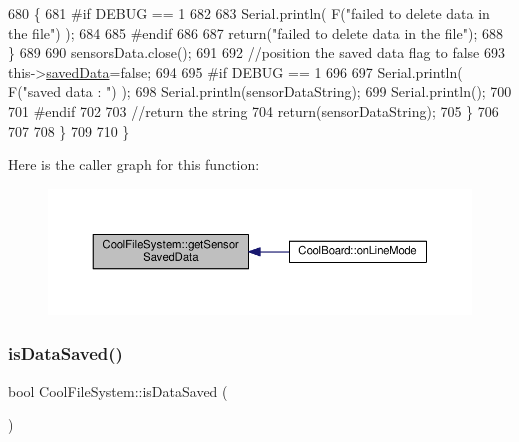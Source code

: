 \begin{DoxyCode}
680             \{
681 \textcolor{preprocessor}{            #if DEBUG == 1}
682         
683                 Serial.println( F(\textcolor{stringliteral}{"failed to delete data in the file"}) );
684         
685 \textcolor{preprocessor}{            #endif}
686 
687                 \textcolor{keywordflow}{return}(\textcolor{stringliteral}{"failed to delete data in the file"});
688             \}
689 
690             sensorsData.close();
691             
692             \textcolor{comment}{//position the saved data flag to false}
693             this->\hyperlink{classCoolFileSystem_ad398e0c5c41a0c88acdf5d672aa71351}{savedData}=\textcolor{keyword}{false}; 
694             
695 \textcolor{preprocessor}{        #if DEBUG == 1 }
696 
697             Serial.println( F(\textcolor{stringliteral}{"saved data : "}) );
698             Serial.println(sensorDataString);
699             Serial.println();
700         
701 \textcolor{preprocessor}{        #endif}
702 
703             \textcolor{comment}{//return the string}
704             \textcolor{keywordflow}{return}(sensorDataString);       
705         \}
706         
707         
708     \}
709 
710 \}
\end{DoxyCode}
Here is the caller graph for this function\+:
\nopagebreak
\begin{figure}[H]
\begin{center}
\leavevmode
\includegraphics[width=350pt]{classCoolFileSystem_a5c58bca3735c0ed3efb268d70ef998ef_icgraph}
\end{center}
\end{figure}
\mbox{\label{classCoolFileSystem_a5a7eaeea7a9fbf8aaef651d862fa3b5b}} 
\subsubsection{\texorpdfstring{is\+Data\+Saved()}{isDataSaved()}}
{\footnotesize\ttfamily bool Cool\+File\+System\+::is\+Data\+Saved (\begin{DoxyParamCaption}{ }\end{DoxyParamCaption})}

